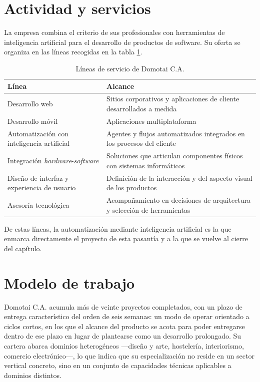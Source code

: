 \section{Actividad y servicios}

La empresa combina el criterio de sus profesionales con herramientas de inteligencia artificial
para el desarrollo de productos de software. Su oferta se organiza en las líneas recogidas en la
tabla \ref{tab:servicios-domotai}.

\begin{table}[H]
  \centering
  \caption{Líneas de servicio de Domotai C.A.}
  \label{tab:servicios-domotai}
  \begin{tabular}{@{}p{}p{}@{}}
    \toprule
    \textbf{Línea} & \textbf{Alcance} \\
    \midrule
    Desarrollo web & Sitios corporativos y aplicaciones de cliente desarrollados a medida \\
    Desarrollo móvil & Aplicaciones multiplataforma \\
    Automatización con inteligencia artificial & Agentes y flujos automatizados integrados en
      los procesos del cliente \\
    Integración \emph{hardware}-\emph{software} & Soluciones que articulan componentes físicos
      con sistemas informáticos \\
    Diseño de interfaz y experiencia de usuario & Definición de la interacción y del aspecto
      visual de los productos \\
    Asesoría tecnológica & Acompañamiento en decisiones de arquitectura y selección de
      herramientas \\
    \bottomrule
  \end{tabular}
\end{table}

De estas líneas, la automatización mediante inteligencia artificial es la que enmarca
directamente el proyecto de esta pasantía y a la que se vuelve al cierre del capítulo.

\section{Modelo de trabajo}

Domotai C.A. acumula más de veinte proyectos completados, con un plazo de entrega característico
del orden de seis semanas: un modo de operar orientado a ciclos cortos, en los que el alcance del
producto se acota para poder entregarse dentro de ese plazo en lugar de plantearse como un
desarrollo prolongado. Su cartera abarca dominios heterogéneos ---diseño y arte, hostelería,
interiorismo, comercio electrónico---, lo que indica que su especialización no reside en un sector
vertical concreto, sino en un conjunto de capacidades técnicas aplicables a dominios distintos.

